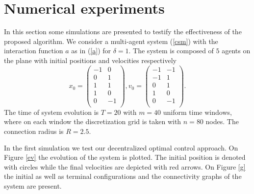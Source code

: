 \documentclass[a4paper,10pt, english]{article}
\begin{document}
 
 
 \section{Numerical experiments}
In this section some simulations are presented to testify the effectiveness of the proposed algorithm. We consider a multi-agent system (\ref{csm}) with the interaction function 
$a$ as in (\ref{a}) for $\delta = 1$. The system is composed of $5$
agents on the plane with initial positions and velocities respectively
\[x_0 =  \left( \begin{array}{cc}
		  -1  &   0\\
           0  &   1\\
           1  &   1\\
           1  &   0\\
           0 &   -1\\
\end{array} \right),
%
v_0 = 
\left( \begin{array}{cc}
	     -1&  -1\\
	     -1&   1\\
	      0&   1\\
	      1&   0\\
	      0&  -1\\
\end{array} \right).
\]
The time of system evolution is $T = 20$ with  $m = 40$ uniform time windows, where  on each window the discretization grid
is taken with $n = 80$ nodes.  The connection radius is $R = 2.5$. 

In the first simulation we test our decentralized optimal control approach. On Figure \ref{ev} the evolution of the system is plotted. The initial position
is denoted with circles while the final velocities are depicted with red arrows. On Figure \ref{g} the initial as well as terminal configurations and the connectivity graphs of the system are present.
\end{document}
